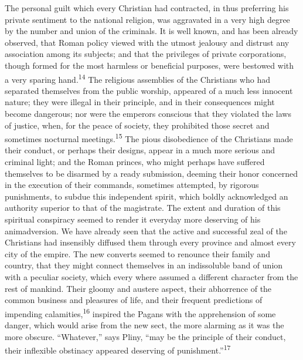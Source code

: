 

The personal guilt which every Christian had contracted, in thus
preferring his private sentiment to the national religion, was
aggravated in a very high degree by the number and union of the
criminals. It is well known, and has been already observed, that
Roman policy viewed with the utmost jealousy and distrust any
association among its subjects; and that the privileges of
private corporations, though formed for the most harmless or
beneficial purposes, were bestowed with a very sparing hand.\textsuperscript{14}
The religious assemblies of the Christians who had separated
themselves from the public worship, appeared of a much less
innocent nature; they were illegal in their principle, and in
their consequences might become dangerous; nor were the emperors
conscious that they violated the laws of justice, when, for the
peace of society, they prohibited those secret and sometimes
nocturnal meetings.\textsuperscript{15} The pious disobedience of the Christians
made their conduct, or perhaps their designs, appear in a much
more serious and criminal light; and the Roman princes, who might
perhaps have suffered themselves to be disarmed by a ready
submission, deeming their honor concerned in the execution of
their commands, sometimes attempted, by rigorous punishments, to
subdue this independent spirit, which boldly acknowledged an
authority superior to that of the magistrate. The extent and
duration of this spiritual conspiracy seemed to render it
everyday more deserving of his animadversion. We have already
seen that the active and successful zeal of the Christians had
insensibly diffused them through every province and almost every
city of the empire. The new converts seemed to renounce their
family and country, that they might connect themselves in an
indissoluble band of union with a peculiar society, which every
where assumed a different character from the rest of mankind.
Their gloomy and austere aspect, their abhorrence of the common
business and pleasures of life, and their frequent predictions of
impending calamities,\textsuperscript{16} inspired the Pagans with the
apprehension of some danger, which would arise from the new sect,
the more alarming as it was the more obscure. “Whatever,” says
Pliny, “may be the principle of their conduct, their inflexible
obstinacy appeared deserving of punishment.”\textsuperscript{17}

